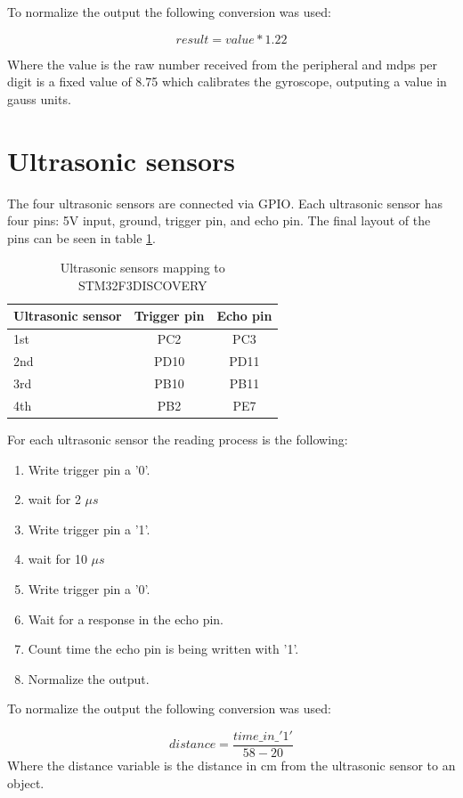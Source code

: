 \documentclass[12pt]{report}%
\begin{document}
To normalize the output the following conversion was used:

\begin{equation} \label{eq:magnetometer}
	result = value * 1.22
\end{equation}

Where the value is the raw number received from the peripheral and mdps per digit is a fixed value of 8.75 which calibrates the gyroscope, outputing a value in gauss units.

\section{Ultrasonic sensors}
\label{sect:ultras}
The four ultrasonic sensors are connected via GPIO. Each ultrasonic sensor has four pins: 5V input, ground, trigger pin, and echo pin. The final layout of the pins can be seen in table \ref{tab:ultras}.
\begin{table}[h!]
\centering
\begin{tabular}{l|c|c}
Ultrasonic sensor & Trigger pin & Echo pin \\\hline
1st	&	PC2		&	PC3		\\
2nd	&	PD10	&	PD11	\\
3rd	&	PB10	&	PB11	\\
4th	&	PB2		&	PE7
\end{tabular}
\caption{\label{tab:ultras}Ultrasonic sensors mapping to STM32F3DISCOVERY}
\end{table}

For each ultrasonic sensor the reading process is the following:
\begin{enumerate}
\item Write trigger pin a '0'.
\item wait for 2 $\mu s$
\item Write trigger pin a '1'.
\item wait for 10 $\mu s$
\item Write trigger pin a '0'.
\item Wait for a response in the echo pin.
\item Count time the echo pin is being written with '1'.
\item Normalize the output.
\end{enumerate}

To normalize the output the following conversion was used:

\begin{equation} \label{eq:ultras}
	distance = \frac{time\_in\_'1'}{58-20}
\end{equation}
Where the distance variable is the distance in cm from the ultrasonic sensor to an object.
\end{document}
